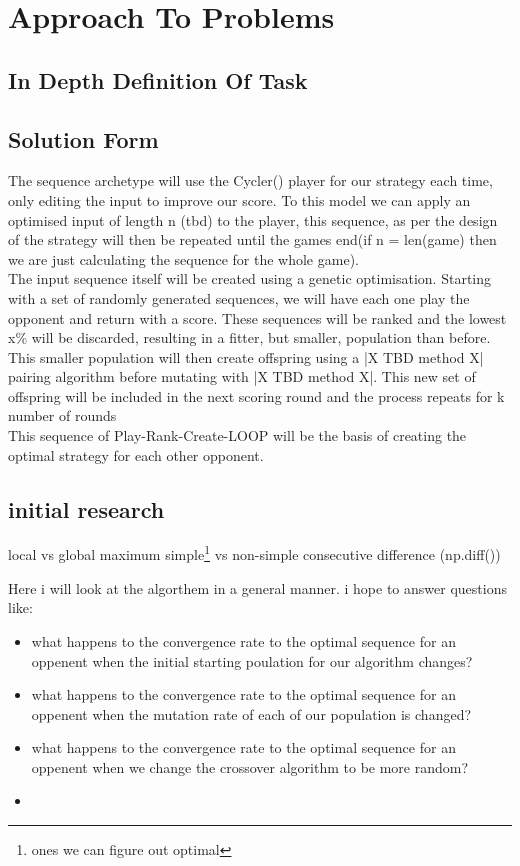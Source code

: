 
\chapter{Approach To Problems}\label{ch:approach}
    \section{In Depth Definition Of Task}
    \section{Solution Form}
The sequence archetype will use the Cycler() player for our strategy each time, only editing the input to improve our score. To this model we can apply an optimised input of length n (tbd) to the player, this sequence, as per the design of the strategy will then be repeated until the games end(if n = len(game) then we are just calculating the sequence for the whole game).\\

The input sequence itself will be created using a genetic optimisation. Starting with a set of randomly generated sequences, we will have each one play the opponent and return with a score. These sequences will be ranked and the lowest x\% will be discarded, resulting in a fitter, but smaller, population than before. This smaller population will then create offspring using a |X TBD method X| pairing algorithm before mutating with |X TBD method X|. This new set of offspring will be included in the next scoring round and the process repeats for k number of rounds\\

This sequence of Play-Rank-Create-LOOP will be the basis of creating the optimal strategy for each other opponent.
    \section{initial research}

local vs global maximum
simple\footnote{ones we can figure out optimal} vs non-simple 
consecutive difference (np.diff())

    Here i will look at the algorthem in a general manner. i hope to answer questions like:
    \begin{itemize}
        \item what happens to the convergence rate to the optimal sequence for an oppenent when the initial starting poulation for our algorithm changes? 
        \item what happens to the convergence rate to the optimal sequence for an oppenent when the mutation rate of each of our population is changed?
        \item  what happens to the convergence rate to the optimal sequence for an oppenent when we change the crossover algorithm to be more random?
        \item 
    \end{itemize}
    
